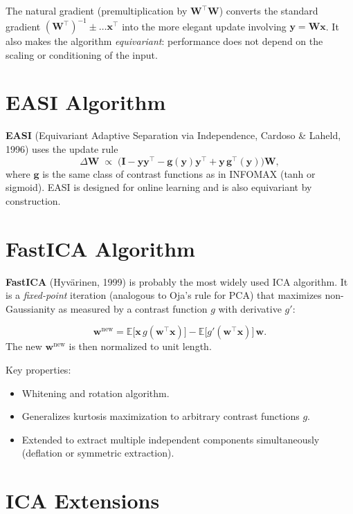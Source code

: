 \documentclass[11pt, oneside]{book}
\newcommand{\E}{\mathbb{E}}
\newcommand{\T}{^{\top}}
\begin{document}
\begin{intbox}
  The natural gradient (premultiplication by $\bm{W}\T\bm{W}$) converts the
  standard gradient $(\bm{W}\T)^{-1} \pm \ldots\bm{x}\T$ into the more elegant
  update involving $\bm{y} = \bm{W}\bm{x}$.
  It also makes the algorithm \emph{equivariant}: performance does not depend on the
  scaling or conditioning of the input.
\end{intbox}


\section{EASI Algorithm}

\textbf{EASI} (Equivariant Adaptive Separation via Independence, Cardoso \& Laheld, 1996)
uses the update rule
\[
  \Delta\bm{W} \;\propto\; \bigl(\bm{I} - \bm{y}\bm{y}\T - \bm{g}(\bm{y})\bm{y}\T
  + \bm{y}\,\bm{g}\T(\bm{y})\bigr)\bm{W},
\]
where $\bm{g}$ is the same class of contrast functions as in INFOMAX (tanh or sigmoid).
EASI is designed for online learning and is also equivariant by construction.


\section{FastICA Algorithm}

\textbf{FastICA} (Hyvärinen, 1999) is probably the most widely used ICA algorithm.
It is a \emph{fixed-point} iteration (analogous to Oja's rule for PCA) that maximizes
non-Gaussianity as measured by a contrast function $g$ with derivative $g'$:

\begin{thmbox}[title={FastICA Update}]
\[
  \bm{w}^{\mathrm{new}} = \E\bigl[\bm{x}\,g(\bm{w}\T\bm{x})\bigr]
  - \E\bigl[g'(\bm{w}\T\bm{x})\bigr]\,\bm{w}.
\]
The new $\bm{w}^{\mathrm{new}}$ is then normalized to unit length.
\end{thmbox}

Key properties:
\begin{itemize}
  \item Whitening and rotation algorithm.
  \item Generalizes kurtosis maximization to arbitrary contrast functions $g$.
  \item Extended to extract multiple independent components simultaneously
        (deflation or symmetric extraction).
\end{itemize}


\section{ICA Extensions}
\end{document}
